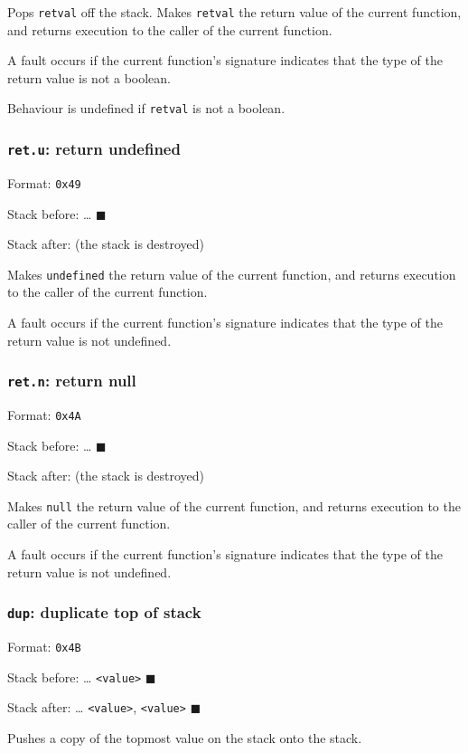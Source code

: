 Pops \texttt{retval} off the stack. Makes \texttt{retval} the return value of the
current function, and returns execution to the caller of the current
function.

A fault occurs if the current function's signature indicates that the
type of the return value is not a boolean.

Behaviour is undefined if \texttt{retval} is not a boolean.

\subsubsection{\texttt{ret.u}: return undefined}
\label{sec:org4462eb4}
Format: \texttt{0x49}

Stack before: \ldots{} \(\blacksquare\)

Stack after: (the stack is destroyed)

Makes \texttt{undefined} the return value of the current function, and returns
execution to the caller of the current function.

A fault occurs if the current function's signature indicates that the
type of the return value is not undefined.

\subsubsection{\texttt{ret.n}: return null}
\label{sec:org02d0940}
Format: \texttt{0x4A}

Stack before: \ldots{} \(\blacksquare\)

Stack after: (the stack is destroyed)

Makes \texttt{null} the return value of the current function, and returns
execution to the caller of the current function.

A fault occurs if the current function's signature indicates that the
type of the return value is not undefined.

\subsubsection{\texttt{dup}: duplicate top of stack}
\label{sec:orgde7ff7a}
Format: \texttt{0x4B}

Stack before: \ldots{} \texttt{<value>} \(\blacksquare\)

Stack after: \ldots{} \texttt{<value>}, \texttt{<value>} \(\blacksquare\)

Pushes a copy of the topmost value on the stack onto the stack.


